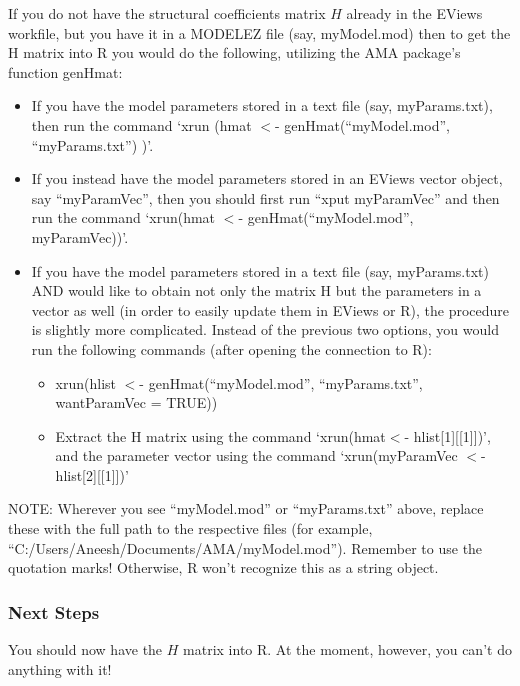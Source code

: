 \documentclass[11pt]{article}
\begin{document}
If you do not have the structural coefficients matrix $H$ already in the EViews workfile, but you have it in a MODELEZ file (say, myModel.mod) then to get the H matrix into R you would do the following, utilizing the AMA package's function genHmat: \begin{itemize}
\item If you have the model parameters stored in a text file (say, myParams.txt), then run the command `xrun (hmat $<$- genHmat(``myModel.mod'', ``myParams.txt'') )'. 
\item  If you instead have the model parameters stored in an EViews vector object, say ``myParamVec'', then you should first run ``xput myParamVec'' and then run the command `xrun(hmat $<$- genHmat(``myModel.mod'', myParamVec))'.
\item If you have the model parameters stored in a text file (say, myParams.txt) AND would like to obtain not only the matrix H but the parameters in a vector as well (in order to easily update them in EViews or R), the procedure is slightly more complicated.  Instead of the previous two options, you would run the following commands (after opening the connection to R):
\begin{itemize}
  \item xrun(hlist $<$- genHmat(``myModel.mod'', ``myParams.txt'', wantParamVec = TRUE))
  \item Extract the H matrix using the command `xrun(hmat$<$- hlist[1][[1]])', and the parameter vector using the command `xrun(myParamVec $<$- hlist[2][[1]])' 
\end{itemize} %
\end{itemize}
NOTE: Wherever you see ``myModel.mod'' or ``myParams.txt'' above, replace these with the full path to the respective files (for example, ``C:/Users/Aneesh/Documents/AMA/myModel.mod'').  Remember to use the quotation marks! Otherwise, R won't recognize this as a string object.

\subsubsection{Next Steps}
You should now have the $H$ matrix into R.  At the moment, however, you can't do anything with it! 
\end{document}
